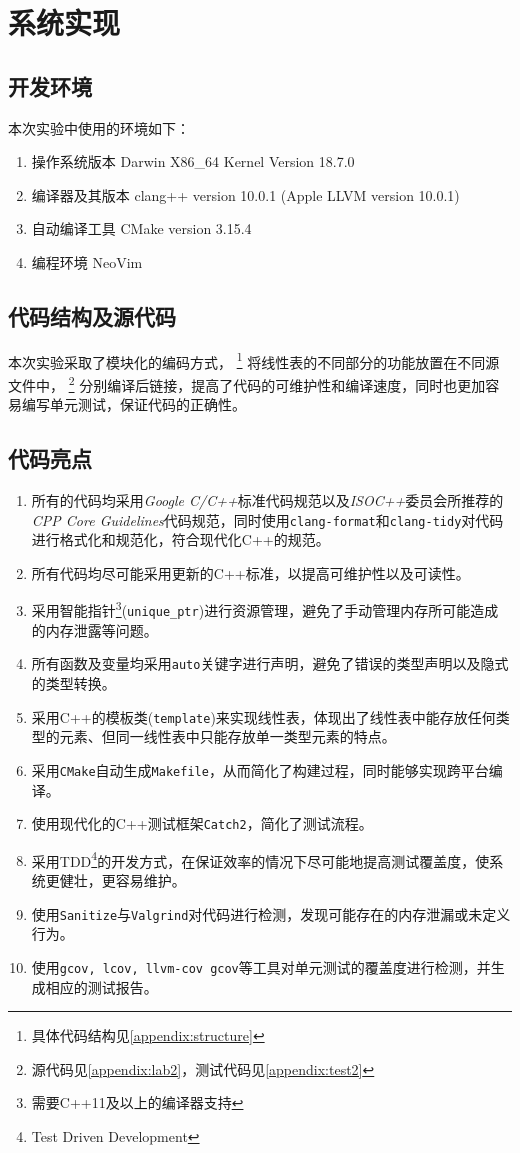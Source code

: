 \section{系统实现}
\subsection{开发环境}
本次实验中使用的环境如下：
\begin{enumerate}
    \item 操作系统版本 Darwin X86\_64 Kernel Version 18.7.0
    \item 编译器及其版本 clang++ version 10.0.1 (Apple LLVM version 10.0.1)
    \item 自动编译工具 CMake version 3.15.4
    \item 编程环境 NeoVim
\end{enumerate}
\subsection{代码结构及源代码}
本次实验采取了模块化的编码方式，
\footnote{具体代码结构见\autoref{appendix:structure}}
将线性表的不同部分的功能放置在不同源文件中，
\footnote{源代码见\autoref{appendix:lab2}，测试代码见\autoref{appendix:test2}}
分别编译后链接，提高了代码的可维护性和编译速度，同时也更加容易编写单元测试，保证代码的正确性。
\subsection{代码亮点}
\begin{enumerate}
        \item 所有的代码均采用\emph{Google
            C/C++}标准代码规范以及\emph{ISOC++}委员会所推荐的\emph{CPP Core Guidelines}代码规范，同时使用\texttt{clang-format}和\texttt{clang-tidy}对代码进行格式化和规范化，符合现代化C++的规范。
        \item 所有代码均尽可能采用更新的C++标准，以提高可维护性以及可读性。
        \item 采用智能指针\footnote{需要C++11及以上的编译器支持}(\texttt{unique\_ptr})进行资源管理，避免了手动管理内存所可能造成的内存泄露等问题。
        \item 所有函数及变量均采用\texttt{auto}关键字进行声明，避免了错误的类型声明以及隐式的类型转换。
        \item 采用C++的模板类(\texttt{template})来实现线性表，体现出了线性表中能存放任何类型的元素、但同一线性表中只能存放单一类型元素的特点。
        \item 采用\texttt{CMake}自动生成\texttt{Makefile}，从而简化了构建过程，同时能够实现跨平台编译。
        \item 使用现代化的C++测试框架\texttt{Catch2}，简化了测试流程。
        \item 采用TDD\footnote{Test Driven Development}的开发方式，在保证效率的情况下尽可能地提高测试覆盖度，使系统更健壮，更容易维护。
        \item 使用\texttt{Sanitize}与\texttt{Valgrind}对代码进行检测，发现可能存在的内存泄漏或未定义行为。
        \item 使用\texttt{gcov, lcov, llvm-cov gcov}等工具对单元测试的覆盖度进行检测，并生成相应的测试报告。
\end{enumerate}

